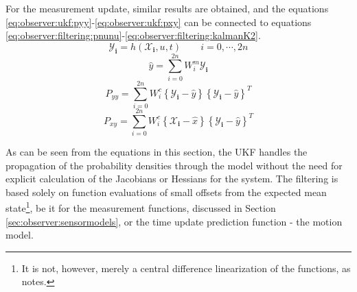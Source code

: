     For the measurement update, similar results are obtained, and the equations
    \eqref{eq:observer:ukf:pyy}-\eqref{eq:observer:ukf:pxy} can be connected to
    equations \eqref{eq:observer:filtering:pnunu}-\eqref{eq:observer:filtering:kalmanK2}.
    \begin{equation}
        \mathbf{\mathcal{Y}_{i}} = h(\mathbf{\mathcal{X}_{i}}, u, t) \qquad i = 0,\cdots,2n
    \end{equation}
    \begin{equation}
        \hat{y} = \sum_{i=0}^{2n}W^{m}_{i}\mathbf{\mathcal{Y}_{i}}
    \end{equation}
    \begin{equation}
        \label{eq:observer:ukf:pyy}
        P_{yy} = \sum_{i=0}^{2n}W^{c}_{i}
            \left\lbrace \mathbf{\mathcal{Y}_{i}} - \hat{y} \right\rbrace
            \left\lbrace \mathbf{\mathcal{Y}_{i}} - \hat{y} \right\rbrace^{T}
    \end{equation}
    \begin{equation}
        \label{eq:observer:ukf:pxy}
        P_{xy} = \sum_{i=0}^{2n}W^{c}_{i}
            \left\lbrace \mathbf{\mathcal{X}_{i}} - \hat{x} \right\rbrace
            \left\lbrace \mathbf{\mathcal{Y}_{i}} - \hat{y} \right\rbrace^{T}
    \end{equation}

    As can be seen from the equations in this section, the UKF handles the
    propagation of the probability densities through the model without
    the need for explicit calculation of the Jacobians or Hessians for the system.
    The filtering is based solely on function evaluations of small offsets from the
    expected mean state\footnote{It is not, however, merely a central difference linearization of the functions, as \citep{Julier95anewapproach} notes.},
    be it for the measurement functions, discussed in
    Section \ref{sec:observer:sensormodels}, or the time update
    prediction function - the motion model.

